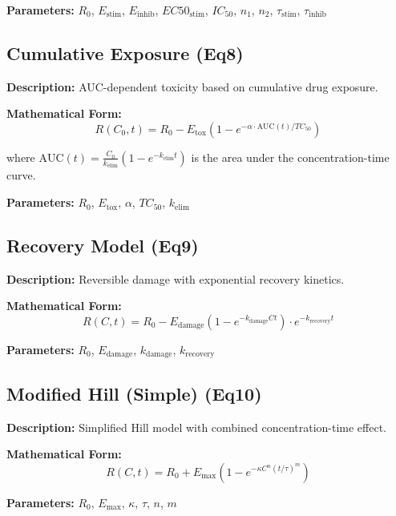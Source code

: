 \documentclass[11pt,a4paper]{article}
\begin{document}
\textbf{Parameters:} $R_0$, $E_{\mathrm{stim}}$, $E_{\mathrm{inhib}}$, $EC50_{\mathrm{stim}}$, $IC_{50}$, $n_1$, $n_2$, $\tau_{\mathrm{stim}}$, $\tau_{\mathrm{inhib}}$


\subsection{Cumulative Exposure (Eq8)}

\textbf{Description:} AUC-dependent toxicity based on cumulative drug exposure.

\textbf{Mathematical Form:}
\begin{equation}
R(C_0,t) = R_0 - E_{\mathrm{tox}}\left(1-e^{-\alpha \cdot \mathrm{AUC}(t)/TC_{50}}\right)
\end{equation}

where $\mathrm{AUC}(t) = \frac{C_0}{k_{\mathrm{elim}}}(1-e^{-k_{\mathrm{elim}} t})$ is the area under the concentration-time curve.

\textbf{Parameters:} $R_0$, $E_{\mathrm{tox}}$, $\alpha$, $TC_{50}$, $k_{\mathrm{elim}}$


\subsection{Recovery Model (Eq9)}

\textbf{Description:} Reversible damage with exponential recovery kinetics.

\textbf{Mathematical Form:}
\begin{equation}
R(C,t) = R_0 - E_{\mathrm{damage}}(1-e^{-k_{\mathrm{damage}} C t}) \cdot e^{-k_{\mathrm{recovery}} t}
\end{equation}

\textbf{Parameters:} $R_0$, $E_{\mathrm{damage}}$, $k_{\mathrm{damage}}$, $k_{\mathrm{recovery}}$


\subsection{Modified Hill (Simple) (Eq10)}

\textbf{Description:} Simplified Hill model with combined concentration-time effect.

\textbf{Mathematical Form:}
\begin{equation}
R(C,t) = R_0 + E_{\mathrm{max}}\left(1 - e^{-\kappa C^n (t/\tau)^m}\right)
\end{equation}

\textbf{Parameters:} $R_0$, $E_{\mathrm{max}}$, $\kappa$, $\tau$, $n$, $m$
\end{document}
